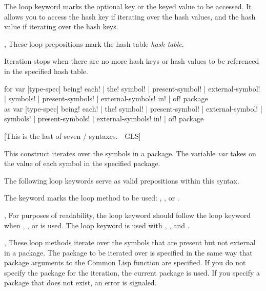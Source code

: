 \begin{new}
\begin{defloop}
\begin{flushdesc}
\item[\cdf{using}]
The loop keyword  marks the optional key or the keyed value to
be accessed.  It allows you to access the hash key if
iterating over the hash values, and the hash value if
iterating over the hash keys.

\item[\cdf{in}, \cdf{of}]
These loop prepositions mark the hash table {\it hash-table}.
\end{flushdesc}

Iteration stops when there are no more hash keys or hash values to be
referenced in the specified hash table.
\end{defloop}


\begin{defloop}
for var [type-spec] \!being! {\!each! | \!the!}
                    {\!symbol! | \!present-symbol! | \!external-symbol! |
                     \!symbols! | \!present-symbols! | \!external-symbols!}
                    {\!in! | \!of!} package \\
as var [type-spec] \!being! {\!each! | \!the!}
                    {\!symbol! | \!present-symbol! | \!external-symbol! |
                     \!symbols! | \!present-symbols! | \!external-symbols!}
                    {\!in! | \!of!} package

[This is the last of seven / syntaxes.---GLS]


This construct iterates over the symbols in a package.
The variable {\it var\/} takes on the value of each symbol
in the specified package.  

The following loop keywords serve as valid prepositions within this syntax.

\begin{flushdesc}

\item[\cdf{being}]
The keyword  marks the loop method to be used:
, ,  or .

\item[\cdf{each}, \cdf{the}]
For purposes of readability, the loop keyword 
should follow the loop keyword  when , 
, or  is used.  The loop keyword
 is used with , , and 
.

\item[\cdf{present-symbol}, \cdf{present-symbols}]
These loop methods iterate over the symbols that are present but not
external in a package.
The package to be iterated over is
specified in the same way that package arguments to the Common Lisp function
 are specified.  If you do not specify the package 
for the iteration, the current package is used.  If you specify a 
package that does not exist, an error is signaled.


\end{flushdesc}
\end{defloop}
\end{new}
